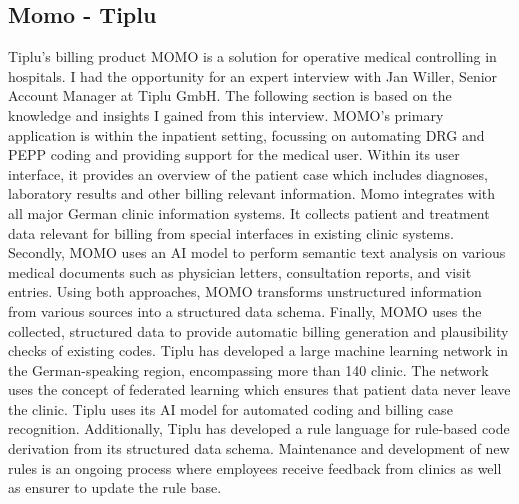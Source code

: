 \subsection{Momo - Tiplu}\label{subsec:momo---tiplu}
Tiplu's billing product MOMO is a solution for operative medical controlling in hospitals.%
I had the opportunity for an expert interview with Jan Willer, Senior Account Manager at Tiplu GmbH.
The following section is based on the knowledge and insights I gained from this interview.
MOMO's primary application is within the inpatient setting, focussing on automating DRG and PEPP coding and providing support for the medical user.%
Within its user interface, it provides an overview of the patient case which includes diagnoses, laboratory results and other billing relevant information.
Momo integrates with all major German clinic information systems.
It collects patient and treatment data relevant for billing from special interfaces in existing clinic systems.
Secondly, MOMO uses an AI model to perform semantic text analysis on various medical documents such as physician letters, consultation reports, and visit entries.
Using both approaches, MOMO transforms unstructured information from various sources into a structured data schema.%
Finally, MOMO uses the collected, structured data to provide automatic billing generation and plausibility checks of existing codes.
Tiplu has developed a large machine learning network in the German-speaking region, encompassing more than 140 clinic.%
The network uses the concept of federated learning which ensures that patient data never leave the clinic.
Tiplu uses its AI model for automated coding and billing case recognition.
Additionally, Tiplu has developed a rule language for rule-based code derivation from its structured data schema.
Maintenance and development of new rules is an ongoing process where employees receive feedback from clinics as well as ensurer to update the rule base.
